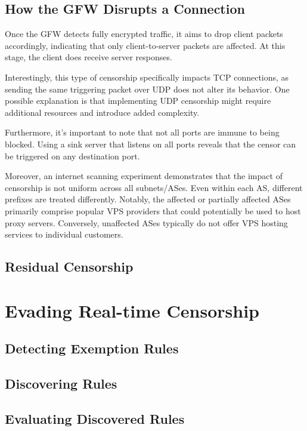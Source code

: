 \subsection{How the GFW Disrupts a Connection}
Once the GFW detects fully encrypted traffic, it aims to drop client packets accordingly, indicating that only client-to-server packets are affected. At this stage, the client does receive server responses.

Interestingly, this type of censorship specifically impacts TCP connections, as sending the same triggering packet over UDP does not alter its behavior. One possible explanation is that implementing UDP censorship might require additional resources and introduce added complexity.

Furthermore, it's important to note that not all ports are immune to being blocked. Using a sink server that listens on all ports reveals that the censor can be triggered on any destination port.

Moreover, an internet scanning experiment demonstrates that the impact of censorship is not uniform across all subnets/ASes. Even within each AS, different prefixes are treated differently. Notably, the affected or partially affected ASes primarily comprise popular VPS providers that could potentially be used to host proxy servers. Conversely, unaffected ASes typically do not offer VPS hosting services to individual customers.\cite{wu2023great}

\subsection{Residual Censorship}

\section{Evading Real-time Censorship}

\subsection{Detecting Exemption Rules}

\subsection{Discovering Rules}

\subsection{Evaluating Discovered Rules}

